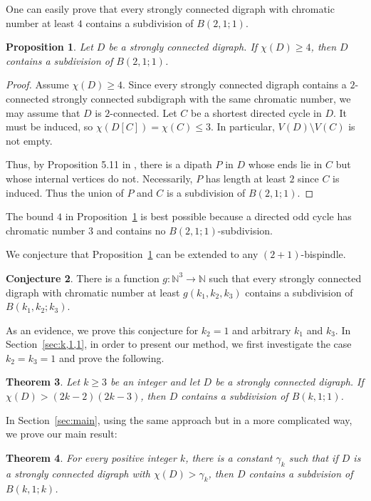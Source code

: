 \documentclass[utf8,10pt]{article}
\theoremstyle{plain}
\newtheorem{theorem}{Theorem}
\newtheorem{proposition}[theorem]{Proposition}
\theoremstyle{definition}
\newtheorem{conjecture}[theorem]{Conjecture}
\theoremstyle{remark}
\begin{document}
One can easily prove that  every strongly connected digraph with chromatic number at least $4$ contains a subdivision of $B(2,1;1)$.
\begin{proposition}\label{prop:p211}
Let $D$ be a strongly connected digraph.
If $\chi(D)\geq 4$, then $D$ contains a subdivision of $B(2,1;1)$.
\end{proposition}
\begin{proof}
Assume  $\chi(D)\geq 4$. Since every strongly connected digraph contains a $2$-connected strongly connected subdigraph with the same chromatic number, we may assume that $D$ is $2$-connected.
Let $C$ be a shortest directed cycle in $D$. 
It must be induced, so $\chi(D[C])=\chi(C) \leq 3$. In particular, $V(D)\setminus V(C)$ is not empty.

Thus, by Proposition 5.11 in \cite{BoMu08},  there is a dipath $P$ in $D$ whose ends lie in $C$ but whose internal
vertices do not. Necessarily, $P$ has length at least $2$ since $C$ is induced.
Thus the union of $P$ and $C$ is a subdivision of $B(2,1;1)$.
\end{proof}

The bound $4$ in Proposition~\ref{prop:p211} is best possible because a directed odd cycle has chromatic number $3$ and contains no $B(2,1;1)$-subdivision.


\medskip


We conjecture that Proposition~\ref{prop:p211} can be extended to any $(2+1)$-bispindle.
\begin{conjecture}\label{conj:3chemins}
There is a function $g:\mathbb{N}^3 \rightarrow \mathbb{N}$ such that  every strongly connected digraph with chromatic number at least $g(k_1,k_2,k_3)$ contains
a subdivision of $B(k_1,k_2;k_3)$.
\end{conjecture}

As an evidence, we prove this conjecture for $k_2=1$ and arbitrary $k_1$ and $k_3$. In Section~\ref{sec:k,1,1}, in order to present our method, we first investigate the case $k_2=k_3=1$ and prove the following.


\begin{theorem}\label{th:P11k}
Let $k \geq 3$ be an integer and let $D$ be a strongly connected digraph. If $\chi(D) >  (2k-2)(2k-3)$, then $D$ contains a subdivision of $B(k,1;1)$.
\end{theorem}

In Section~\ref{sec:main}, using the same approach but in a more complicated way, we prove our main result: 

\begin{theorem}\label{th:main}
For every positive integer $k$, there is a constant $\gamma_k$ such that if $D$ is a strongly connected digraph with $\chi(D) > \gamma_k$, then $D$ contains a subdvision of $B(k,1;k)$.
\end{theorem}
\end{document}
